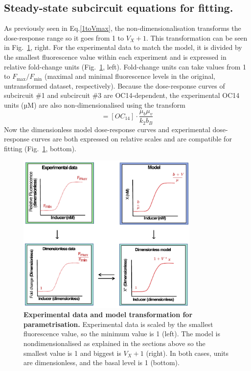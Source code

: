 \subsection{Steady-state subcircuit equations for fitting.}
As previously seen in Eq.\ref{1toVmax},
the non-dimensionalisation transforms the dose-response range so it goes from 1 to $V_{X}+1$.
This transformation can be seen in Fig.~\ref{fig:dose_response_transforms}, right.
For the experimental data to match the model,
it is divided by the smallest fluorescence value within each experiment and is expressed in relative fold-change units
(Fig.~\ref{fig:dose_response_transforms}, left).
Fold-change units can take values from 1 to $F_{\max}/F_{\min}$
(maximal and minimal fluorescence levels in the original, untransformed dataset, respectively).
Because the dose-response curves of subcircuit \#1 and subcircuit \#3 are OC14-dependent, the experimental OC14 units (µM) are also non-dimensionalised using the transform
\begin{equation}
    [B*]=[OC_{14}] \cdot \frac{\mu_{b}\mu_{v}}{k_{2}b_{B}}
    \label{Btransform}
\end{equation}
Now the dimensionless model dose-response curves and experimental dose-response curves are both expressed on relative scales and are compatible for fitting (Fig.~\ref{fig:dose_response_transforms}, bottom).
\begin{figure}[H] %
    \centering
    \begin{adjustbox}{center}
        \includegraphics[width=0.8\textwidth]{chapters/Chapter 2/dose_response_transforms}
    \end{adjustbox}
    \caption{\textbf{Experimental data and model transformation for parametrisation.} Experimental data is scaled by the smallest fluorescence value, so the minimum value is 1 (left). The model is nondimensionalised
    as explained in the sections above so the smallest value is 1
    and biggest is $V_{X} +1$ (right).
    In both cases, units are dimensionless, and the basal level is 1 (bottom).}
    \label{fig:dose_response_transforms}
\end{figure}


